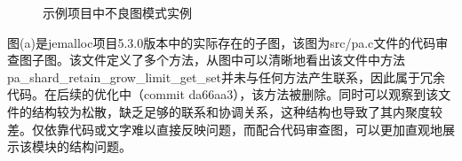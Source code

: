 \begin{figure}[!h]
    \setlength{\subfigcapskip}{-1bp}
    \centering
    \begin{minipage}{\textwidth}
    \centering
    \hspace{2em}
    \end{minipage}
    \centering
    \begin{minipage}{\textwidth}
    \centering
    \hspace{2em}
    \end{minipage}
    \vspace{0.2em}
    \caption{示例项目中不良图模式实例} %
\end{figure}



图(a)是jemalloc项目5.3.0版本中的实际存在的子图，该图为src/pa.c文件的代码审查图子图。该文件定义了多个方法，从图中可以清晰地看出该文件中方法pa\_shard\_retain\_grow\_limit\_get\_set并未与任何方法产生联系，因此属于冗余代码。在后续的优化中（commit da66aa3），该方法被删除。同时可以观察到该文件的结构较为松散，缺乏足够的联系和协调关系，这种结构也导致了其内聚度较差。仅依靠代码或文字难以直接反映问题，而配合代码审查图，可以更加直观地展示该模块的结构问题。

